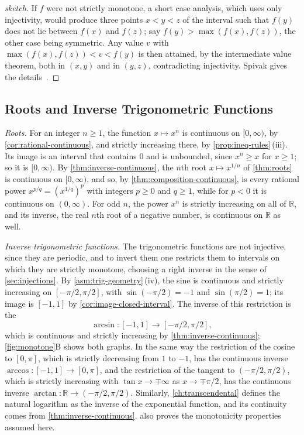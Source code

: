 \begin{proof}[sketch]
If $f$ were not strictly monotone, a short case analysis, which uses only injectivity, would produce three points $x<y<z$ of the interval such that $f(y)$ does not lie between $f(x)$ and $f(z)$; say $f(y)>\max(f(x),f(z))$, the other case being symmetric. Any value $v$ with $\max(f(x),f(z))<v<f(y)$ is then attained, by the intermediate value theorem, both in $(x,y)$ and in $(y,z)$, contradicting injectivity. Spivak gives the details~\cite{spivak2008calculus}.
\end{proof}

\subsection{Roots and Inverse Trigonometric Functions}

\emph{Roots.} For an integer $n\ge1$, the function $x\mapsto x^n$ is continuous on $[0,\infty)$, by \cref{cor:rational-continuous}, and strictly increasing there, by \cref{prop:ineq-rules}\,(iii). Its image is an interval that contains $0$ and is unbounded, since $x^n\ge x$ for $x\ge1$; so it is $[0,\infty)$. By \cref{thm:inverse-continuous}, the $n$th root $x\mapsto x^{1/n}$ of \cref{thm:roots} is continuous on $[0,\infty)$, and so, by \cref{thm:composition-continuous}, is every rational power $x^{p/q}=(x^{1/q})^p$ with integers $p\ge0$ and $q\ge1$, while for $p<0$ it is continuous on $(0,\infty)$. For odd $n$, the power $x^n$ is strictly increasing on all of $\mathbb R$, and its inverse, the real $n$th root of a negative number, is continuous on $\mathbb R$ as well.

\emph{Inverse trigonometric functions.} The trigonometric functions are not injective, since they are periodic, and to invert them one restricts them to intervals on which they are strictly monotone, choosing a right inverse in the sense of \cref{sec:injections}. By \cref{asm:trig-geometry}\,(iv), the sine is continuous and strictly increasing on $[-\pi/2,\pi/2]$, with $\sin(-\pi/2)=-1$ and $\sin(\pi/2)=1$; its image is $[-1,1]$ by \cref{cor:image-closed-interval}. The inverse of this restriction is the 
\[
\arcsin\colon[-1,1]\to[-\pi/2,\pi/2],
\]
which is continuous and strictly increasing by \cref{thm:inverse-continuous}; \cref{fig:monotone}B shows both graphs. In the same way the restriction of the cosine to $[0,\pi]$, which is strictly decreasing from $1$ to $-1$, has the continuous inverse $\arccos\colon[-1,1]\to[0,\pi]$, and the restriction of the tangent to $(-\pi/2,\pi/2)$, which is strictly increasing with $\tan x\to\mp\infty$ as $x\to\mp\pi/2$, has the continuous inverse $\arctan\colon\mathbb R\to(-\pi/2,\pi/2)$. Similarly, \cref{ch:transcendental} defines the natural logarithm as the inverse of the exponential function, and its continuity comes from \cref{thm:inverse-continuous}.  also proves the monotonicity properties assumed here.

